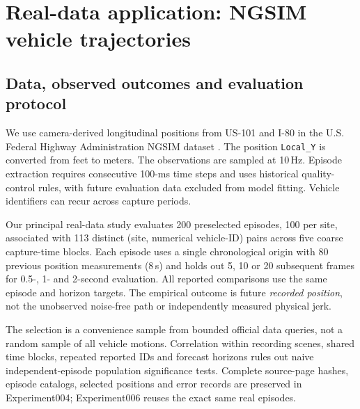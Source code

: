 \section{Real-data application: NGSIM vehicle trajectories}
\label{sec:real}

\subsection{Data, observed outcomes and evaluation protocol}
We use camera-derived longitudinal positions from
US-101 and I-80 in the U.S. Federal Highway Administration
NGSIM dataset \citep{fhwa2016}. The position
\texttt{Local\_Y} is converted from feet to meters.
The observations are sampled at 10\,Hz. Episode
extraction requires consecutive 100-ms time steps
and uses historical quality-control rules, with
future evaluation data excluded from model fitting.
Vehicle identifiers can recur across capture periods.

Our principal real-data study evaluates 200
preselected episodes, 100 per site, associated
with 113 distinct (site, numerical vehicle-ID)
pairs across five coarse capture-time blocks.
Each episode uses a single chronological origin
with 80 previous position measurements (8\,s)
and holds out 5, 10 or 20 subsequent frames
for 0.5-, 1- and 2-second evaluation.
All reported comparisons use the same
episode and horizon targets. The empirical
outcome is future \emph{recorded position},
not the unobserved noise-free path or
independently measured physical jerk.

The selection is a convenience sample from
bounded official data queries, not a random
sample of all vehicle motions. Correlation
within recording scenes, shared time blocks,
repeated reported IDs and forecast horizons
rules out naive independent-episode
population significance tests. Complete
source-page hashes, episode catalogs,
selected positions and error records are
preserved in Experiment004; Experiment006
reuses the exact same real episodes.

